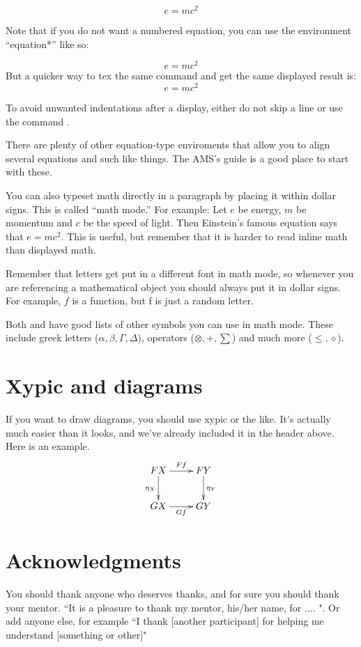 \documentclass[openany, amssymb, psamsfonts]{amsart}
\theoremstyle{definition}
\numberwithin{equation}{section}
\begin{document}
\begin{equation}  e = mc^2
\end{equation}

Note that if you do not want a numbered equation, you can use the
environment ``equation*''
 like so:

\begin{equation*}
e=mc^2
\end{equation*}
But a quicker way to tex the same command and get the same displayed result is:
\[  e=mc^2 \]

To avoid unwanted indentations after a display, either do not skip a line or use the command \noindent.

There are plenty of other equation-type enviroments that allow you to
align several equations and such like things. The AMS's guide \cite{amsshort} is a
good place to start with these.

You can also typeset math directly in a paragraph by placing it within
dollar signs.  This is called ``math mode.''  For example: Let $e$
be energy, $m$ be momentum and $c$ be the speed of light.  Then
Einstein's famous equation says that $e=mc^2$.  This is useful, but
remember that it is harder to read inline math than displayed math. 

Remember that letters get put in a different font in math mode, so
whenever you are referencing a mathematical object you should always
put it in dollar signs.  For example, $f$ is a function, but f is just
a random letter.

Both \cite{notsoshort} and \cite{amsshort} have good lists of other symbols you can use in math mode.
These include greek letters ($\alpha, \beta, \Gamma, \Delta$),
operators ($\otimes, +, \sum$) and much more ($\leq, \diamond$).

\section{Xypic and diagrams}

If you want to draw diagrams, you should use xypic or the like.  It's actually
much easier than it looks, and we've already included it in the header
above.  Here is an example. 
\[\xymatrix{
FX \ar[r]^-{Ff} \ar[d]_{\eta_X} & FY \ar[d]^{\eta_Y} \\
GX \ar[r]_-{Gf} & GY\\} \]

\section*{Acknowledgments}  You should thank anyone who deserves thanks, and for sure you should
thank your mentor.   ``It is a pleasure to thank my mentor, 
his/her name, for ....  ".   Or add anyone else, for example ``I thank [another participant] for helping 
me understand [something or other]"
\end{document}

